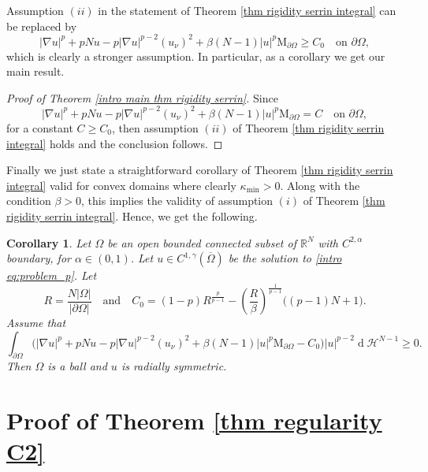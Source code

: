 \documentclass[10pt,a4paper, reqno]{amsart}
\numberwithin{equation}{section}
\newcommand{\R}{\mathbb{R}}
\newtheorem{cor}[teo]{Corollary}
\renewcommand{\d}[1]{\ensuremath{\operatorname{d}\!{#1}}}
\begin{document}
Assumption $(ii)$ in the statement of Theorem \ref{thm rigidity serrin integral} can be replaced by
\begin{equation*}
    |\nabla u|^p + pNu - p |\nabla u|^{p-2} (u_\nu)^2 + \beta(N-1) |u|^p \mathrm{M}_{\partial\Omega}  \geq C_0 \quad \text{on } \partial\Omega,
\end{equation*}
which is clearly a stronger assumption. In particular, as a corollary we get our main result.

\begin{proof}[Proof of Theorem \ref{intro main thm rigidity serrin}]
    Since 
    \[
    |\nabla u|^p + pNu - p |\nabla u|^{p-2} (u_\nu)^2 + \beta(N-1) |u|^p \mathrm{M}_{\partial\Omega} = C\quad \text{on } \partial\Omega,
    \]
    for a constant $C \geq C_0$, then assumption $(ii)$ of Theorem \ref{thm rigidity serrin integral} holds and the conclusion follows.
\end{proof}

Finally we just state a straightforward corollary of Theorem \ref{thm rigidity serrin integral} valid for convex domains where clearly $\kappa_{\min} > 0$. Along with the condition $\beta>0$, this implies the validity of assumption $(i)$ of Theorem \ref{thm rigidity serrin integral}. Hence, we get the following.

\begin{cor}\label{cor rigidity serrin integral}
     Let $\Omega$ be an open bounded connected subset of $\R^N$ with $C^{2,\alpha}$ boundary, for $\alpha \in (0,1)$. Let $u \in C^{1,\gamma}(\overline{\Omega})$ be the solution to \eqref{intro eq:problem_p}. Let 
    \begin{equation*}
        R = \frac{N|\Omega|}{|\partial\Omega|} \quad \text{and} \quad  C_0 = (1-p)R^{\frac{p}{p-1}} - \left( \frac{R}{\beta} \right)^{\frac{1}{p-1}} \big( (p-1)N + 1 \big). 
    \end{equation*}
    Assume that 
    \[
    \displaystyle \int_{\partial\Omega} \Big( |\nabla u|^p + pNu - p |\nabla u|^{p-2} (u_\nu)^2 + \beta(N-1) |u|^p \mathrm{M}_{\partial\Omega}  - C_0 \Big) |u|^{p-2} \d{}\mathcal{H}^{N-1} \geq 0.
    \]
    Then $\Omega$ is a ball and $u$ is radially symmetric.
\end{cor}

\appendix
\section{Proof of Theorem \ref{thm regularity C2}}\label{sec: appendix reg}
\end{document}
